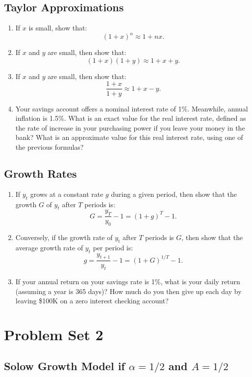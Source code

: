 \documentclass[]{book}
\begin{document}
\section{Taylor Approximations}\label{taylor-approximations}

\begin{enumerate}
\def\labelenumi{\arabic{enumi}.}
\item
  If \(x\) is small, show that: \[(1+x)^n \approx 1+nx.\]
\item
  If \(x\) and \(y\) are small, then show that:
  \[(1+x)(1+y) \approx 1+x+y.\]
\item
  If \(x\) and \(y\) are small, then show that:
  \[\frac{1+x}{1+y} \approx 1+x-y.\]
\item
  Your savings account offers a nominal interest rate of 1\%. Meanwhile,
  annual inflation is 1.5\%. What is an exact value for the real
  interest rate, defined as the rate of increase in your purchasing
  power if you leave your money in the bank? What is an approximate
  value for this real interest rate, using one of the previous formulas?
\end{enumerate}

\section{Growth Rates}\label{growth-rates}

\begin{enumerate}
\def\labelenumi{\arabic{enumi}.}
\item
  If \(y_t\) grows at a constant rate \(g\) during a given period, then
  show that the growth \(G\) of \(y_t\) after \(T\) periods is:
  \[G = \frac{y_T}{y_0}-1=(1+g)^T-1.\]
\item
  Conversely, if the growth rate of \(y_t\) after \(T\) periods is
  \(G\), then show that the average growth rate of \(y_t\) per period
  is: \[g = \frac{y_{t+1}}{y_{t}}-1=(1+G)^{1/T}-1.\]
\item
  If your annual return on your savings rate is 1\%, what is your daily
  return (assuming a year is 365 days)? How much do you then give up
  each day by leaving \$100K on a zero interest checking account?
\end{enumerate}

\chapter{Problem Set 2}\label{pset2}

\section{\texorpdfstring{Solow Growth Model if \(\alpha = 1/2\) and
\(A=1/2\)}{Solow Growth Model if \textbackslash{}alpha = 1/2 and A=1/2}}\label{solow-growth-model-if-alpha-12-and-a12}
\end{document}
